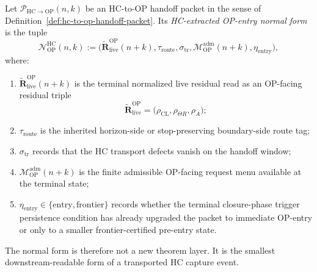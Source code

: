 \begin{definition}
\label{def:hc-extracted-op-entry-normal-form}
Let $\mathcal P_{\mathrm{HC}\to\mathrm{OP}}(n,k)$ be an HC-to-OP handoff packet in the sense of Definition~\ref{def:hc-to-op-handoff-packet}.  Its \emph{HC-extracted OP-entry normal form} is the tuple
\[
  \mathcal N_{\mathrm{OP}}^{\mathrm{HC}}(n,k)
  :=
  \bigl(
    \widetilde{\mathbf R}_{\mathrm{live}}^{\mathrm{OP}}(n+k),
    \tau_{\mathrm{route}},
    \sigma_{\mathrm{tr}},
    \mathcal M_{\mathrm{OP}}^{\mathrm{adm}}(n+k),
    \eta_{\mathrm{entry}}
  \bigr),
\]
where:
\begin{enumerate}[leftmargin=2em,label=(\alph*)]
  \item $\widetilde{\mathbf R}_{\mathrm{live}}^{\mathrm{OP}}(n+k)$ is the terminal normalized live residual read as an OP-facing residual triple
  \[
    \widetilde{\mathbf R}_{\mathrm{live}}^{\mathrm{OP}}
    =
    \bigl(\rho_{\mathrm{CL}},\rho_{\Theta R},\rho_A\bigr);
  \]
  \item $\tau_{\mathrm{route}}$ is the inherited horizon-side or stop-preserving boundary-side route tag;
  \item $\sigma_{\mathrm{tr}}$ records that the HC transport defects vanish on the handoff window;
  \item $\mathcal M_{\mathrm{OP}}^{\mathrm{adm}}(n+k)$ is the finite admissible OP-facing request menu available at the terminal state;
  \item $\eta_{\mathrm{entry}}\in\{\mathrm{entry},\mathrm{frontier}\}$ records whether the terminal closure-phase trigger persistence condition has already upgraded the packet to immediate OP-entry or only to a smaller frontier-certified pre-entry state.
\end{enumerate}
The normal form is therefore not a new theorem layer.  It is the smallest downstream-readable form of a transported HC capture event.
\end{definition}

